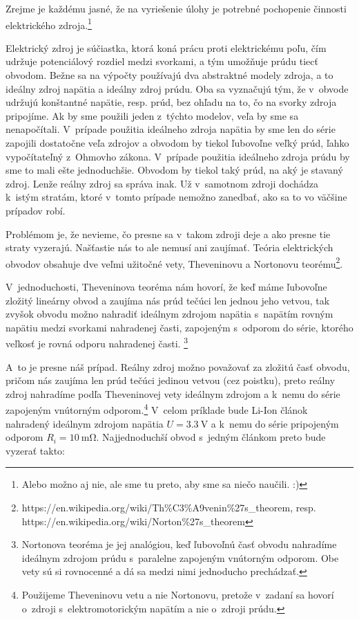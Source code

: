 
Zrejme je každému jasné, že na vyriešenie úlohy je potrebné pochopenie
činnosti elektrického zdroja.\footnote{Alebo možno aj nie, ale sme tu preto, aby sme sa niečo naučili. :)}

Elektrický zdroj je súčiastka, ktorá koná prácu proti elektrickému
poľu, čím udržuje potenciálový rozdiel medzi svorkami, a tým umožňuje
prúdu tiecť obvodom. Bežne sa na výpočty používajú dva abstraktné
modely zdroja, a to ideálny zdroj napätia a ideálny zdroj prúdu. Oba
sa vyznačujú tým, že v~obvode udržujú konštantné napätie, resp. prúd,
bez ohľadu na to, čo na svorky zdroja pripojíme. Ak by sme použili
jeden z~týchto modelov, veľa by sme sa nenapočítali. V~prípade použitia
ideálneho zdroja napätia by sme len do série zapojili dostatočne veľa
zdrojov a obvodom by tiekol ľubovoľne veľký prúd, ľahko vypočítateľný
z~Ohmovho zákona. V~prípade použitia ideálneho zdroja prúdu by sme
to mali ešte jednoduchšie. Obvodom by tiekol taký prúd, na aký je
stavaný zdroj. Lenže reálny zdroj sa správa inak. Už v~samotnom zdroji
dochádza k~istým stratám, ktoré v~tomto prípade nemožno zanedbať,
ako sa to vo väčšine prípadov robí.

Problémom je, že nevieme, čo presne sa v~takom zdroji deje a ako presne
tie straty vyzerajú. Našťastie nás to ale nemusí ani zaujímať. Teória
elektrických obvodov obsahuje dve veľmi užitočné vety, Theveninovu
a Nortonovu teorému\footnote{https://en.wikipedia.org/wiki/Th\%C3\%A9venin\%27s\_theorem, resp.
https://en.wikipedia.org/wiki/Norton\newline\%27s\_theorem}. 

V~jednoduchosti, Theveninova teoréma nám hovorí, že keď máme ľubovoľne
zložitý lineárny obvod a zaujíma nás prúd tečúci len jednou jeho vetvou,
tak zvyšok obvodu možno nahradiť ideálnym zdrojom napätia s~napätím rovným 
napätiu medzi svorkami nahradenej časti, zapojeným s~odporom do série,
ktorého veľkosť je rovná odporu nahradenej časti.
\footnote{Nortonova teoréma je jej analógiou, keď ľubovoľnú časť obvodu nahradíme 
ideálnym zdrojom prúdu s~paralelne zapojeným vnútorným odporom. Obe
vety sú si rovnocenné a dá sa medzi nimi jednoducho prechádzať.} 

A~to je presne náš prípad. Reálny zdroj možno považovať za zložitú
časť obvodu, pričom nás zaujíma len prúd tečúci jedinou vetvou (cez
poistku), preto reálny zdroj nahradíme podľa Theveninovej vety ideálnym
zdrojom a k~nemu do série zapojeným vnútorným odporom.\footnote{Použijeme Theveninovu vetu a nie Nortonovu, pretože v~zadaní sa hovorí o~zdroji s~elektromotorickým napätím a nie o~zdroji prúdu.} V~celom príklade bude Li-Ion článok nahradený ideálnym zdrojom napätia
$U=\SI{3.3}{\volt}$ a k~nemu do série pripojeným odporom $R_{i}=\SI{10}{\milli\ohm}$.
Najjednoduchší obvod s~jedným článkom preto bude vyzerať takto:

